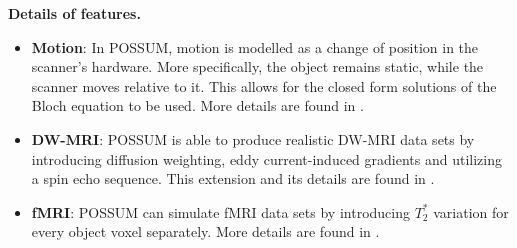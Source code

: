 
\hfill

\textbf{Details of features.}
\begin{itemize}
    
    \item \textbf{Motion}: In POSSUM, motion is modelled as a change of position in the scanner's hardware. 
    More specifically, the object remains static, while the scanner moves relative to it.
    This allows for the closed form solutions of the Bloch equation to be used.
    More details are found in \cite{Drobnjak2006}.
    
    \item \textbf{DW-MRI}: POSSUM is able to produce realistic DW-MRI data sets by introducing diffusion weighting, eddy current-induced gradients and utilizing a spin echo sequence.
    This extension and its details are found in \cite{Graham2016}.
    
    \item \textbf{fMRI}: POSSUM can simulate fMRI data sets by introducing $T_2^*$ variation for every object voxel separately.
    More details are found in \cite{Drobnjak2006}.

\end{itemize}

\hfill

